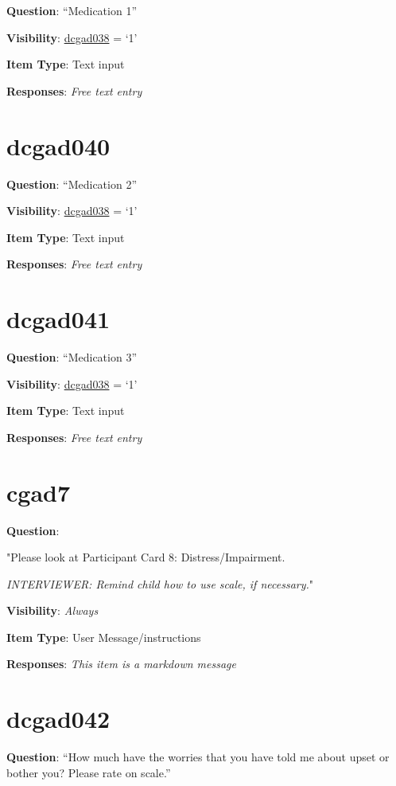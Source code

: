 \documentclass[]{book}
\begin{document}
\textbf{Question}: ``Medication 1''

\textbf{Visibility}: \protect\hyperlink{dcgad038}{dcgad038} = `1'

\textbf{Item Type}: Text input

\textbf{Responses}: \emph{Free text entry}

\hypertarget{dcgad040}{%
\section{dcgad040}\label{dcgad040}}

\textbf{Question}: ``Medication 2''

\textbf{Visibility}: \protect\hyperlink{dcgad038}{dcgad038} = `1'

\textbf{Item Type}: Text input

\textbf{Responses}: \emph{Free text entry}

\hypertarget{dcgad041}{%
\section{dcgad041}\label{dcgad041}}

\textbf{Question}: ``Medication 3''

\textbf{Visibility}: \protect\hyperlink{dcgad038}{dcgad038} = `1'

\textbf{Item Type}: Text input

\textbf{Responses}: \emph{Free text entry}

\hypertarget{cgad7}{%
\section{cgad7}\label{cgad7}}

\textbf{Question}:

"Please look at Participant Card 8: Distress/Impairment.

\emph{INTERVIEWER: Remind child how to use scale, if necessary.}"

\textbf{Visibility}: \emph{Always}

\textbf{Item Type}: User Message/instructions

\textbf{Responses}: \emph{This item is a markdown message}

\hypertarget{dcgad042}{%
\section{dcgad042}\label{dcgad042}}

\textbf{Question}: ``How much have the worries that you have told me about upset or bother you? Please rate on scale.''
\end{document}

